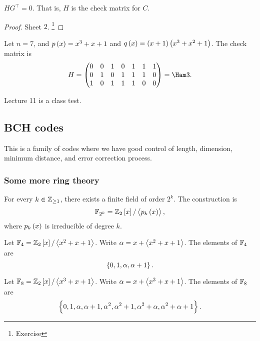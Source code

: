 \begin{proposition}
$ HG^\intercal = 0 $. That is, $ H $ is the check matrix for $ C $.
\end{proposition}

\begin{proof}
Sheet $ 2 $. \footnote{Exercise}
\end{proof}

\begin{example*}
Let $ n = 7 $, and $ p\br{x} = x^3 + x + 1 $ and $ q\br{x} = \br{x + 1}\br{x^3 + x^2 + 1} $. The check matrix is
$$ H =
\begin{pmatrix}
0 & 0 & 1 & 0 & 1 & 1 & 1 \\
0 & 1 & 0 & 1 & 1 & 1 & 0 \\
1 & 0 & 1 & 1 & 1 & 0 & 0
\end{pmatrix}
= \Ham 3. $$
\end{example*}


Lecture 11 is a class test.

\pagebreak

\subsection{BCH codes}


This is a family of codes where we have good control of length, dimension, minimum distance, and error correction process.

\subsubsection{Some more ring theory}

\begin{fact*}
For every $ k \in \mathbb{Z}_{\ge 1} $, there exists a finite field of order $ 2^k $. The construction is
$$ \FF_{2^k} = \ZZ_2\sbr{x} / \abr{p_k\br{x}}, $$
where $ p_k\br{x} $ is irreducible of degree $ k $.
\end{fact*}

\begin{example*}
Let $ \FF_4 = \ZZ_2\sbr{x} / \abr{x^2 + x + 1} $. Write $ \alpha = x + \left\langle x^2 + x + 1 \right\rangle $. The elements of $ \mathbb{F}_4 $ are
$$ \cbr{0, 1, \alpha, \alpha + 1}. $$
\end{example*}

\begin{example*}
Let $ \FF_8 = \ZZ_2\sbr{x} / \abr{x^3 + x + 1} $. Write $ \alpha = x + \left\langle x^3 + x + 1 \right\rangle $. The elements of $ \mathbb{F}_8 $ are
$$ \cbr{0, 1, \alpha, \alpha + 1, \alpha^2, \alpha^2 + 1, \alpha^2 + \alpha, \alpha^2 + \alpha + 1}. $$
\end{example*}

